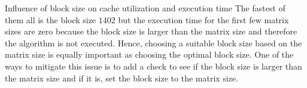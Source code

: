 \documentclass[12pt]{article}
\begin{document}
\begin{section}{Influence of block size on cache utilization and execution time}
 The fastest of them all is the block size $1402$ but the execution time for the first few matrix sizes are zero because
 the block size is larger than the matrix size and therefore the algorithm is not executed. Hence, choosing a suitable
 block size based on the matrix size is equally important as choosing the optimal block size. One of the ways to mitigate
 this issue is to add a check to see if the block size is larger than the matrix size and if it is, set the block size to
 the matrix size.
\end{section}
\end{document}
